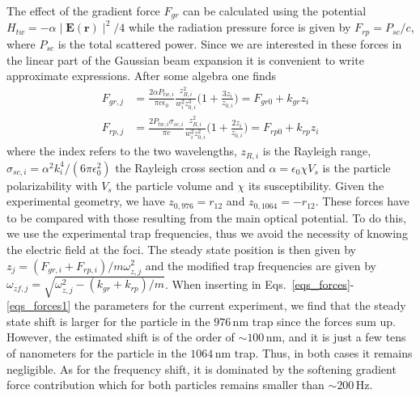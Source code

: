 \documentclass[aps,PRA,%
 amsmath,amssymb,
singlecolumn,
notitlepage,superscriptaddress,groupedaddress]{revtex4}
\begin{document}
The effect of the gradient force $F_{gr}$ can be calculated using the potential $H_{tw}=-\alpha \mid  \mathbf{E}(\mathbf{r})\mid^2/4$ while the radiation pressure force is given by $F_{rp}=P_{sc}/c$, where $P_{sc}$ is the total scattered power. Since we are interested in these forces in the linear part of the Gaussian beam expansion it is convenient to write approximate expressions. After some algebra one finds
\begin{align}\label{eqs_forces}
    F_{gr,j}&=\frac{2\alpha P_{tw,i}}{\pi c\epsilon_0}\frac{z_{R,i}^2}{w_i^2 z_{0,i}^3}\bigg( 1+\frac{3 z_i}{z_{0,i}} \bigg)=F_{gr0}+k_{gr} z_i\\
    \label{eqs_forces1}
    F_{rp,j}&=\frac{2P_{tw,i}\sigma_{sc,i}}{\pi c}\frac{z_{R,i}^2}{w_i^2z_{0,i}^2}\bigg(1+\frac{2z_i}{z_{0,i}}\bigg)=F_{rp0}+k_{rp}  z_i  
\end{align}
\noindent where the index refers to the two wavelengths, $z_{R,i}$ is the Rayleigh range, $\sigma_{sc,i}=\alpha^2k_i^4/(6\pi\epsilon_0^2)$ the Rayleigh cross section and $\alpha=\epsilon_0\chi V_s$ is the particle polarizability with $V_s$ the particle volume and $\chi$ its susceptibility. Given the experimental geometry, we have $z_{0,976}=r_{12}$ and $z_{0,1064}=-r_{12}$. These forces have to be compared with those resulting from the main optical potential. To do this, we use the experimental trap frequencies, thus we avoid the necessity of knowing the electric field at the foci. The steady state position is then given by $z_j=(F_{gr,i}+F_{rp,i})/m\omega_{z,j}^2$ and the modified trap frequencies are given by $\omega_{zf,j}=\sqrt{\omega_{z,j}^2-(k_{gr}+k_{rp})/m}$. When inserting in Eqs.~\ref{eqs_forces}-\ref{eqs_forces1} the parameters for the current experiment, we find that the steady state shift is larger for the particle in the $976$\,nm trap since the forces sum up. However, the estimated shift is of the order of $\sim100$\,nm, and it is just a few tens of nanometers for the particle in the $1064$\,nm trap. Thus, in both cases it remains negligible. As for the frequency shift, it is dominated by the softening gradient force contribution which for both particles remains smaller than $\sim200$\,Hz. 
\end{document}
